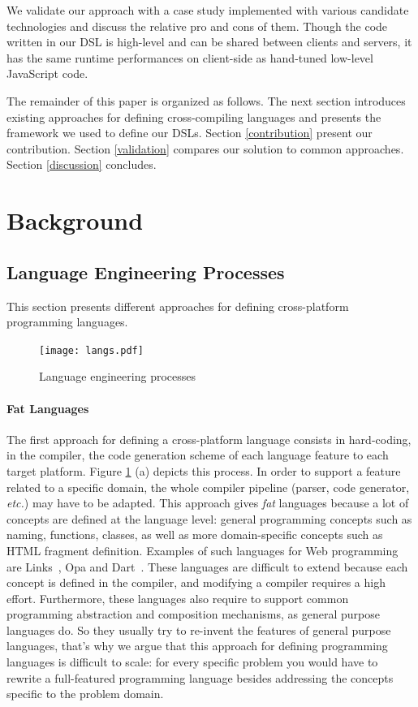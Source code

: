 \documentclass[preprint]{sigplanconf}
\newcommand{\etc}{\emph{etc.}}
\begin{document}
We validate our approach with a case study implemented with various candidate technologies and
discuss the relative pro and cons of them. Though the code written in our DSL is high-level and can
be shared between clients and servers, it has the same runtime performances on client-side as
hand-tuned low-level JavaScript code.

The remainder of this paper is organized as follows. The next section introduces existing approaches
for defining cross-compiling languages and presents the framework we used to define our DSLs.
Section \ref{contribution} present our contribution. Section \ref{validation} compares our solution
to common approaches. Section \ref{discussion} concludes.

\section{Background}

\subsection{Language Engineering Processes}

This section presents different approaches for defining cross-platform programming languages.

\begin{figure}
\begin{center}
\texttt{[image: langs.pdf]}
\end{center}
\caption{Language engineering processes}
\label{langs}
\end{figure}

\paragraph{Fat Languages}

The first approach for defining a cross-platform language consists in hard-coding, in the compiler,
the code generation scheme of each language feature to each target platform. Figure \ref{langs} (a)
depicts this process. In order to support a feature related to a specific domain, the whole compiler
pipeline (parser, code generator, \etc) may have to be adapted. This approach gives \emph{fat}
languages because a lot of concepts are defined at the language level: general programming concepts
such as naming, functions, classes, as well as more domain-specific concepts such as HTML fragment
definition. Examples of such languages for Web programming are Links~\cite{Cooper07_Links}, Opa and
Dart~\cite{Griffith11_Dart}. These languages are difficult to extend because each concept is defined
in the compiler, and modifying a compiler requires a high effort. Furthermore, these languages also
require to support common programming abstraction and composition mechanisms, as general purpose
languages do. So they usually try to re-invent the features of general purpose languages, that’s why
we argue that this approach for defining programming languages is difficult to scale: for every
specific problem you would have to rewrite a full-featured programming language besides addressing
the concepts specific to the problem domain.
\end{document}
